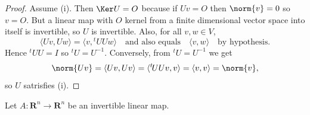 {{\begin{Solution}
\begin{proof}
            Assume (i). 
            Then $\Ker U = O$ because if $Uv = O$ then $\norm{v} = 0$ so $v = O$. 
            But a linear map with $O$ kernel from a finite dimensional vector space into itself is invertible, so $U$ is invertible. 
            Also, for all $v, w \in V$, 
            \begin{equation*}
                \langle Uv, Uw \rangle = \langle v, {^{t\!}U}Uw \rangle \quad \text{and also equals} \quad \langle v, w \rangle \quad \text{by hypothesis}. 
            \end{equation*}
            Hence ${^{t\!}U}U = I$ so ${^{t\!}U} = U^{-1}$. Conversely, from ${^{t\!}U} = U^{-1}$ we get 
            \begin{equation*}
                \norm{Uv} = \langle Uv, Uv \rangle = \langle {^{t\!}U}Uv, v \rangle = \langle v, v \rangle = \norm{v}, 
            \end{equation*}
            so $U$ satrisfies (i). 
        \end{proof}
    \end{Solution}
    \item 
    Let $A: \mathbf{R}^n \to \mathbf{R}^n$ be an invertible linear map. 
    \begin{Solution}
\end{Solution}}}
